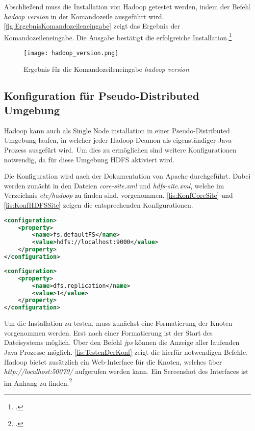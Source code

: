 Abschließend muss die Installation von Hadoop getestet werden, indem der Befehl \textit{hadoop version} in der Komandozeile ausgeführt wird. \autoref{fig:ErgebnisKomandozeileneingabe} zeigt das Ergebnis der Komandozeileneingabe. Die Ausgabe bestätigt die erfolgreiche Installation.\footcite[Vgl.][S. 32 f.]{Freiknecht.2014}

\begin{figure}[h]
	\texttt{[image: hadoop\_version.png]}
	\caption{Ergebnis für die Komandozeileneingabe \textit{hadoop version}}
	\label{fig:ErgebnisKomandozeileneingabe}
\end{figure}

\subsection{Konfiguration für Pseudo-Distributed Umgebung}
Hadoop kann auch als Single Node installation in einer Pseudo-Distributed Umgebung laufen, in welcher jeder Hadoop Deamon als eigenständiger Java-Prozess ausgefürt wird. Um dies zu ermöglichen sind weitere Konfigurationen notwendig, da für diese Umgebung \ac{HDFS} aktiviert wird.

Die Konfiguration wird nach der Dokumentation von Apache durchgeführt. Dabei werden zunächt in den Dateien \textit{core-site.xml} und \textit{hdfs-site.xml}, welche im Verzeichnis \textit{etc/hadoop} zu finden sind, vorgenommen. \autoref{lis:KonfCoreSite} und \autoref{lis:KonfHDFSSite} zeigen die entsprechenden Konfigurationen. \\

\pagebreak
\begin{lstlisting}[language=XML, caption=Konfiguration in der core-site.xml, label=lis:KonfCoreSite]
<configuration>
	<property>
		<name>fs.defaultFS</name>
		<value>hdfs://localhost:9000</value>
	</property>
</configuration>
\end{lstlisting}

\begin{lstlisting}[language=XML, caption=Konfiguration in der hdfs-site.xml, label=lis:KonfHDFSSite]
<configuration>
	<property>
		<name>dfs.replication</name>
		<value>1</value>
	</property>
</configuration>
\end{lstlisting}

Um die Installation zu testen, muss zunächst eine Formatierung der Knoten vorgenommen werden. Erst nach einer Formatierung ist der Start des Dateisystems möglich. Über den Befehl \textit{jps} können die Anzeige aller laufenden Java-Prozesse möglich. \autoref{lis:TestenDerKonf} zeigt die hierfür notwendigen Befehle. Hadoop bietet zusätzlich ein Web-Interface für die Knoten, welches über \textit{http://localhost:50070/} aufgerufen werden kann. Ein Screenshot des Interfaces ist im Anhang zu finden.\footcite[Vgl.][]{ApacheHadoopDoku.2015} \\

